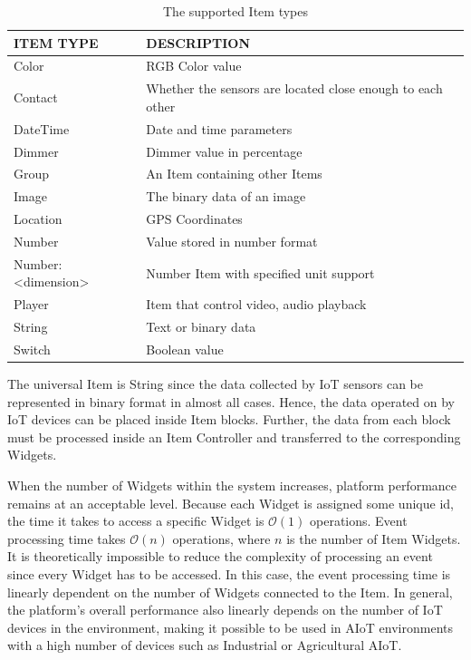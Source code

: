 \begin{table}
  \centering
  \begin{threeparttable}[c]
    \caption{The supported Item types}
    \label{tab:items-table}
    \begin{tabular}{ll}
      \toprule
      ITEM TYPE    &         DESCRIPTION                 \\
      \midrule
      Color &	RGB Color value \\
      Contact & Whether the sensors are located close enough to each other \\
      DateTime & Date and time parameters \\
      Dimmer &	Dimmer value in percentage \\
      Group &	An Item containing other Items \\
      Image &	The binary data of an image \\
      Location & GPS Coordinates \\
      Number & Value stored in number format \\
      Number:<dimension> & Number Item with specified unit support \\
      Player & Item that control video, audio playback \\
      String &	Text or binary data \\
      Switch & Boolean value \\
      \bottomrule
    \end{tabular}
  \end{threeparttable}
\end{table}

The universal Item is String since the data collected by IoT sensors can be represented in binary format in almost all cases. Hence, the data operated on by IoT devices can be placed inside Item blocks. Further, the data from each block must be processed inside an Item Controller and transferred to the corresponding Widgets. 

When the number of Widgets within the system increases, platform performance remains at an acceptable level. Because each Widget is assigned some unique id, the time it takes to access a specific Widget is $\mathcal{O}(1)$ operations. Event processing time takes $\mathcal{O}(n)$ operations, where $n$ is the number of Item Widgets. It is theoretically impossible to reduce the complexity of processing an event since every Widget has to be accessed. In this case, the event processing time is linearly dependent on the number of Widgets connected to the Item. In general, the platform's overall performance also linearly depends on the number of IoT devices in the environment, making it possible to be used in AIoT environments with a high number of devices such as Industrial or Agricultural AIoT.